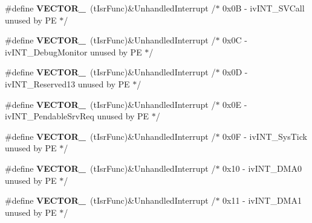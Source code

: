 \begin{DoxyCompactItemize}
\item 
\#define {\bfseries V\+E\+C\+T\+O\+R\+\_}~(t\+Isr\+Func)\&Unhandled\+Interrupt         /$\ast$ 0x0\+B -\/    iv\+I\+N\+T\+\_\+\+S\+V\+Call                   unused by P\+E $\ast$/\hypertarget{group___vectors___config__module_ga60f18fcfe2414811fa9a32c8a370e9e9}{}\label{group___vectors___config__module_ga60f18fcfe2414811fa9a32c8a370e9e9}

\item 
\#define {\bfseries V\+E\+C\+T\+O\+R\+\_}~(t\+Isr\+Func)\&Unhandled\+Interrupt         /$\ast$ 0x0\+C -\/    iv\+I\+N\+T\+\_\+\+Debug\+Monitor             unused by P\+E $\ast$/\hypertarget{group___vectors___config__module_ga66adf4b9d317b22e92af1d9f36dfe79e}{}\label{group___vectors___config__module_ga66adf4b9d317b22e92af1d9f36dfe79e}

\item 
\#define {\bfseries V\+E\+C\+T\+O\+R\+\_}~(t\+Isr\+Func)\&Unhandled\+Interrupt         /$\ast$ 0x0\+D -\/    iv\+I\+N\+T\+\_\+\+Reserved13               unused by P\+E $\ast$/\hypertarget{group___vectors___config__module_ga045b0cf8ac9c11ae4b334ac8a875996c}{}\label{group___vectors___config__module_ga045b0cf8ac9c11ae4b334ac8a875996c}

\item 
\#define {\bfseries V\+E\+C\+T\+O\+R\+\_}~(t\+Isr\+Func)\&Unhandled\+Interrupt         /$\ast$ 0x0\+E -\/    iv\+I\+N\+T\+\_\+\+Pendable\+Srv\+Req           unused by P\+E $\ast$/\hypertarget{group___vectors___config__module_ga4be26068bbd00472d90391c766d43dfe}{}\label{group___vectors___config__module_ga4be26068bbd00472d90391c766d43dfe}

\item 
\#define {\bfseries V\+E\+C\+T\+O\+R\+\_}~(t\+Isr\+Func)\&Unhandled\+Interrupt         /$\ast$ 0x0\+F -\/    iv\+I\+N\+T\+\_\+\+Sys\+Tick                  unused by P\+E $\ast$/\hypertarget{group___vectors___config__module_ga4aee2f15a66604c282b5fefa9944368c}{}\label{group___vectors___config__module_ga4aee2f15a66604c282b5fefa9944368c}

\item 
\#define {\bfseries V\+E\+C\+T\+O\+R\+\_}~(t\+Isr\+Func)\&Unhandled\+Interrupt         /$\ast$ 0x10 -\/    iv\+I\+N\+T\+\_\+\+D\+M\+A0                     unused by P\+E $\ast$/\hypertarget{group___vectors___config__module_ga4acad800525fb6c1fe56a7cfa48d8d81}{}\label{group___vectors___config__module_ga4acad800525fb6c1fe56a7cfa48d8d81}

\item 
\#define {\bfseries V\+E\+C\+T\+O\+R\+\_}~(t\+Isr\+Func)\&Unhandled\+Interrupt         /$\ast$ 0x11 -\/    iv\+I\+N\+T\+\_\+\+D\+M\+A1                     unused by P\+E $\ast$/\hypertarget{group___vectors___config__module_gae9942458a5468beda8c44e746510fe00}{}\label{group___vectors___config__module_gae9942458a5468beda8c44e746510fe00}


\end{DoxyCompactItemize}

